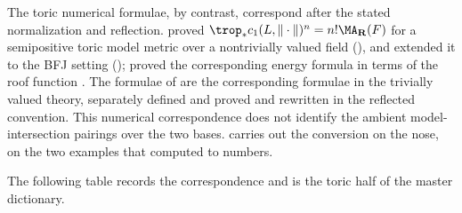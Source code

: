 The toric numerical formulae, by contrast, correspond after the stated
normalization and reflection.
 proved
$\trop_*c_1(L,\|\cdot\|)^n=n!\MA_{\mathbf R}(F)$ for a semipositive toric
model metric over a nontrivially valued field
(), and
 extended it to the BFJ setting
();  proved the
corresponding energy formula in terms of the roof function
.  The formulae of  are the
corresponding formulae in the trivially valued theory, separately defined
and proved and rewritten in the reflected convention.  This numerical
correspondence does not identify the ambient model-intersection pairings
over the two bases.   carries out the
conversion on the nose, on the two examples that
 computed to numbers.

The following table records the correspondence and is the toric half of the
master dictionary.

